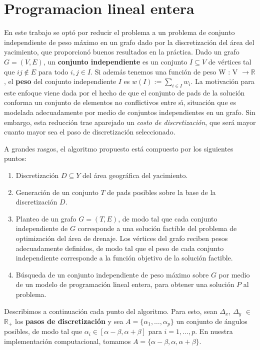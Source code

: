 \newpage
\section{Programacion lineal entera}

En este trabajo se opt\'o por reducir el problema a un problema de conjunto independiente de peso m\'aximo en un grafo dado por la discretizaci\'on del \'area del yacimiento, que proporcion\'o buenos resultados en la pr\'actica. Dado un grafo $G=(V,E)$, un \textbf{conjunto independiente} es un conjunto $I\subseteq V$ de v\'ertices tal que $ij\not\in E$ para todo $i,j\in I$. Si adem\'as tenemos una funci\'on de peso W : V $\rightarrow \mathbb{R}$, el \textbf{peso} del conjunto independiente $I$ es $w(I) := \sum_{i\in I} w_i$. La motivaci\'on para este enfoque viene dada por el hecho de que el conjunto de pads de la soluci\'on conforma un conjunto de elementos no conflictivos entre s\'\i, situaci\'on que es modelada adecuadamente por medio de conjuntos independientes en un grafo. Sin embargo, esta reducci\'on trae aparejado un \emph{costo de discretizaci\'on}, que ser\'a mayor cuanto mayor sea el paso de discretizaci\'on seleccionado.

A grandes rasgos, el algoritmo propuesto est\'a compuesto por los siguientes puntos:
\begin{enumerate}
\item Discretizaci\'on $D\subseteq Y$ del \'area geogr\'afica del yacimiento.
\item Generaci\'on de un conjunto $T$ de pads posibles sobre la base de la discretizaci\'on $D$.
\item Planteo de un grafo $G=(T,E)$, de modo tal que cada conjunto independiente de $G$ corresponde a una soluci\'on factible del problema de optimizaci\'on del \'area de drenaje. Los v\'ertices del grafo reciben pesos adecuadamente definidos, de modo tal que el peso de cada conjunto independiente corresponde a la funci\'on objetivo de la soluci\'on factible.
\item B\'usqueda de un conjunto independiente de peso m\'aximo sobre $G$ por medio de un modelo de programaci\'on lineal entera, para obtener una soluci\'on $P$ al problema.
\end{enumerate}
Describimos a continuaci\'on cada punto del algoritmo. Para esto, sean $\Delta_x$, $\Delta_y$ $\in$ $\mathbb{R}_{+}$ los \textbf{pasos de discretizaci\'on} y sea $A=\{\alpha_1,\dots,\alpha_p\}$ un conjunto de \'angulos posibles, de modo tal que $\alpha_i\in[\alpha-\beta,\alpha+\beta]$ para $i=1,\dots,p$. En nuestra implementaci\'on computacional, tomamos $A=\{\alpha-\beta,\alpha,\alpha+\beta\}$.


